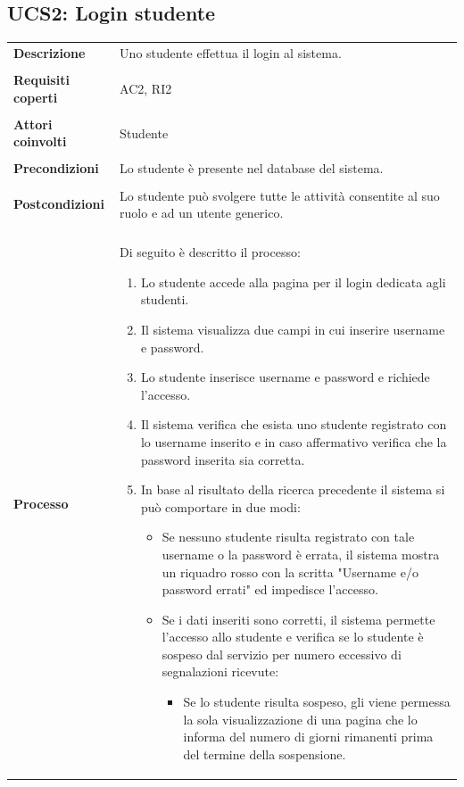 \documentclass[10pt,a4paper]{report}
\begin{document}
	\subsection{UCS2: Login studente}
	\begin{tabular}{lp{}}
		\textbf{Descrizione}&Uno studente effettua il login al sistema.\\
		\\
		\textbf{Requisiti coperti}&AC2, RI2\\
		\\
		\textbf{Attori coinvolti}&Studente\\
		\\
		\textbf{Precondizioni}&Lo studente è presente nel database del sistema.\\
		\\
		\textbf{Postcondizioni}&Lo studente può svolgere tutte le attività consentite al suo ruolo e ad un utente generico.\\
		\\
		\textbf{Processo}&Di seguito è descritto il processo:
		\begin{enumerate}
			\item Lo studente accede alla pagina per il login dedicata agli studenti.
			\item Il sistema visualizza due campi in cui inserire username e password.
			\item Lo studente inserisce username e password e richiede l'accesso.
			\item Il sistema verifica che esista uno studente registrato con lo username inserito e in caso affermativo verifica che la password inserita sia corretta.
			\item In base al risultato della ricerca precedente il sistema si può comportare in due modi:
			\begin{itemize}
				\item Se nessuno studente risulta registrato con tale username o la password è errata, il sistema mostra un riquadro rosso con la scritta "Username e/o password errati" ed impedisce l'accesso.
				\item Se i dati inseriti sono corretti, il sistema permette l'accesso allo studente e verifica se lo studente è sospeso dal servizio per numero eccessivo di segnalazioni ricevute:
				\begin{itemize}
					\item Se lo studente risulta sospeso, gli viene permessa la sola visualizzazione di una pagina che lo informa del numero di giorni rimanenti prima del termine della sospensione.

\end{itemize}
\end{itemize}
\end{enumerate}
\end{tabular}
\end{document}
